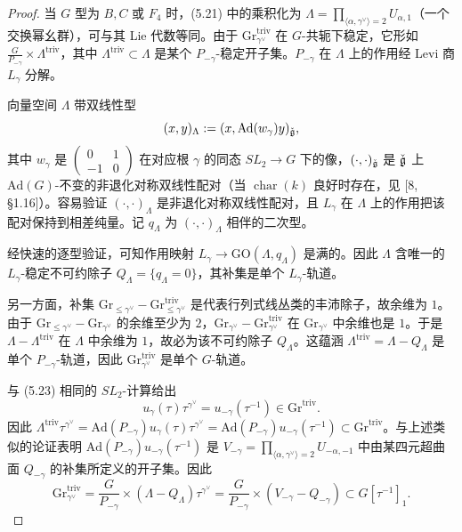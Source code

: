 \begin{proof}
当 $G$ 型为 $B,C$ 或 $F_4$ 时，(5.21) 中的乘积化为 $\Lambda=\prod_{\langle\alpha,\gamma^\vee\rangle=2}U_{\alpha,1}$（一个交换幂幺群），可与其 Lie 代数等同。由于 $\mathrm{Gr}^{\mathrm{triv}}_{\gamma^\vee}$ 在 $G$-共轭下稳定，它形如 $\frac{G}{P_{-\gamma}}\times\Lambda^{\mathrm{triv}}$，其中 $\Lambda^{\mathrm{triv}}\subset\Lambda$ 是某个 $P_{-\gamma}$-稳定开子集。$P_{-\gamma}$ 在 $\Lambda$ 上的作用经 Levi 商 $L_\gamma$ 分解。

向量空间 $\Lambda$ 带双线性型
\begin{equation}
(x,y)_\Lambda:=(x,\mathrm{Ad}(w_\gamma)y)_{\check{\mathfrak g}},
\end{equation}
其中 $w_\gamma$ 是 $\begin{pmatrix}0&1\\-1&0\end{pmatrix}$ 在对应根 $\gamma$ 的同态 $SL_2\to G$ 下的像，$(\cdot,\cdot)_{\check{\mathfrak g}}$ 是 $\check{\mathfrak g}$ 上 $\mathrm{Ad}(G)$-不变的非退化对称双线性配对（当 $\operatorname{char}(k)$ 良好时存在，见 [8, §1.16]）。容易验证 $(\cdot,\cdot)_\Lambda$ 是非退化对称双线性配对，且 $L_\gamma$ 在 $\Lambda$ 上的作用把该配对保持到相差纯量。记 $q_\Lambda$ 为 $(\cdot,\cdot)_\Lambda$ 相伴的二次型。

经快速的逐型验证，可知作用映射 $L_\gamma\to\mathrm{GO}(\Lambda,q_\Lambda)$ 是满的。因此 $\Lambda$ 含唯一的 $L_\gamma$-稳定不可约除子 $Q_\Lambda=\{q_\Lambda=0\}$，其补集是单个 $L_\gamma$-轨道。

另一方面，补集 $\mathrm{Gr}_{\le\gamma^\vee}-\mathrm{Gr}^{\mathrm{triv}}_{\le\gamma^\vee}$ 是代表行列式线丛类的丰沛除子，故余维为 $1$。由于 $\mathrm{Gr}_{\le\gamma^\vee}-\mathrm{Gr}_{\gamma^\vee}$ 的余维至少为 $2$，$\mathrm{Gr}_{\gamma^\vee}-\mathrm{Gr}^{\mathrm{triv}}_{\gamma^\vee}$ 在 $\mathrm{Gr}_{\gamma^\vee}$ 中余维也是 $1$。于是 $\Lambda-\Lambda^{\mathrm{triv}}$ 在 $\Lambda$ 中余维为 $1$，故必为该不可约除子 $Q_\Lambda$。这蕴涵 $\Lambda^{\mathrm{triv}}=\Lambda-Q_\Lambda$ 是单个 $P_{-\gamma}$-轨道，因此 $\mathrm{Gr}^{\mathrm{triv}}_{\gamma^\vee}$ 是单个 $G$-轨道。

与 (5.23) 相同的 $SL_2$-计算给出
\[
u_\gamma(\tau)\tau^{\gamma^\vee}=u_{-\gamma}(\tau^{-1})\in\mathrm{Gr}^{\mathrm{triv}}.
\]
因此 $\Lambda^{\mathrm{triv}}\tau^{\gamma^\vee}=\mathrm{Ad}(P_{-\gamma})u_\gamma(\tau)\tau^{\gamma^\vee}=\mathrm{Ad}(P_{-\gamma})u_{-\gamma}(\tau^{-1})\subset\mathrm{Gr}^{\mathrm{triv}}$。与上述类似的论证表明 $\mathrm{Ad}(P_{-\gamma})u_{-\gamma}(\tau^{-1})$ 是 $V_{-\gamma}=\prod_{\langle\alpha,\gamma^\vee\rangle=2}U_{-\alpha,-1}$ 中由某四元超曲面 $Q_{-\gamma}$ 的补集所定义的开子集。因此
\[
\mathrm{Gr}^{\mathrm{triv}}_{\gamma^\vee}=\frac{G}{P_{-\gamma}}\times(\Lambda-Q_\Lambda)\tau^{\gamma^\vee}=\frac{G}{P_{-\gamma}}\times(V_{-\gamma}-Q_{-\gamma})\subset G[\tau^{-1}]_1.
\]
\end{proof}


